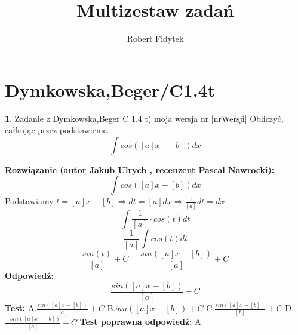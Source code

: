 \documentclass[12pt, a4paper]{article}
\title{Multizestaw zadań}
\author{Robert Fidytek}
\date{}
\theoremstyle{definition} %
\newtheorem{zad}{}
\newcommand{\kategoria}[1]{\section{#1}} %
\newcommand{\zadStart}[1]{\begin{zad}#1\newline} %
\newcommand{\zadStop}{\end{zad}}   %
\newcommand{\rozwStart}[2]{\noindent \textbf{Rozwiązanie (autor #1 , recenzent #2): }\newline} %
\newcommand{\rozwStop}{\newline}                                            %
\newcommand{\odpStart}{\noindent \textbf{Odpowiedź:}\newline}    %
\newcommand{\odpStop}{\newline}                                             %
\newcommand{\testStart}{\noindent \textbf{Test:}\newline} %
\newcommand{\testStop}{\newline} %
\newcommand{\kluczStart}{\noindent \textbf{Test poprawna odpowiedź:}\newline} %
\newcommand{\kluczStop}{\newline} %
\begin{document}
\maketitle


\kategoria{Dymkowska,Beger/C1.4t}
\zadStart{Zadanie z Dymkowska,Beger C 1.4 t) moja wersja nr [nrWersji]}
Obliczyć, całkując przez podstawienie.$$\int cos([a]x-[b])dx$$
\zadStop
\rozwStart{Jakub Ulrych}{Pascal Nawrocki}
$$\int cos([a]x-[b])dx$$
Podstawiamy $t=[a]x-[b]\Rightarrow dt=[a]dx \Rightarrow\frac{1}{[a]}dt=dx$
$$\int\frac{1}{[a]}\cdot cos(t)dt$$
$$\frac{1}{[a]}\int cos(t)dt$$
$$\frac{sin(t)}{[a]}+C=\frac{sin([a]x-[b])}{[a]}+C$$
\rozwStop
\odpStart
$$\frac{sin([a]x-[b])}{[a]}+C$$
\odpStop
\testStart
A.$\frac{sin([a]x-[b])}{[a]}+C$
B.$sin([a]x-[b])+C$
C.$\frac{sin([a]x-[b])}{[b]}+C$
D.$\frac{-sin([a]x-[b])}{[a]}+C$
\testStop
\kluczStart
A
\kluczStop
\end{document}
